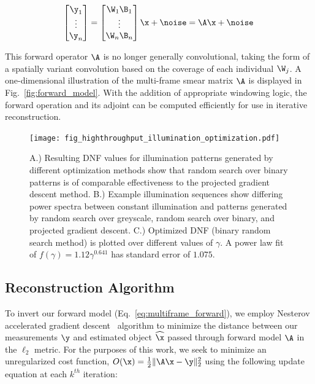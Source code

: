 \begin{equation}
\label{eq:multiframe_forward}
\begin{bmatrix}\y_1\\ \vdots \\ \y_n \end{bmatrix} = \begin{bmatrix}\W_1\B_1 \\ \vdots \\ \W_n \B_n \end{bmatrix} \x + \noise = \A\x + \noise\:
\end{equation}

This forward operator $\A$ is no longer generally convolutional, taking the form of a spatially variant convolution based on the coverage of each individual $\W_j$. A one-dimensional illustration of the multi-frame smear matrix $\A$ is displayed in Fig.~\ref{fig:forward_model}.
With the addition of appropriate windowing logic, the forward operation and its adjoint can be computed efficiently for use in iterative reconstruction.

\begin{figure}
  \centering
    \texttt{[image: fig\_highthroughput\_illumination\_optimization.pdf]}

  \caption{ \label{fig:illum_optimization} A.) Resulting DNF values for illumination patterns generated by different optimization methods show that random search over binary patterns is of comparable effectiveness to the projected gradient descent method. B.) Example illumination sequences show differing power spectra between constant illumination and patterns generated by random search over greyscale, random search over binary, and projected gradient descent. C.) Optimized DNF (binary random search method) is plotted over different values of $\gamma$. A power law fit of $f(\gamma) = 1.12 \gamma^{0.641}$ has standard error of $1.075$.}
\end{figure}

\subsection{Reconstruction Algorithm}\label{sec:recon}
To invert our forward model (Eq.~\ref{eq:multiframe_forward}), we employ Nesterov accelerated gradient descent~\cite{nesterov} algorithm to minimize the distance between our measurements $\y$ and estimated object $\widehat \x$ passed through forward model $\A$ in the $\ell_2$ metric. For the purposes of this work, we seek to minimize an unregularized cost function, $O(\x) = \frac{1}{2}\|\A\x - \y\|_2^2$ using the following update equation at each $k^{th}$ iteration:

